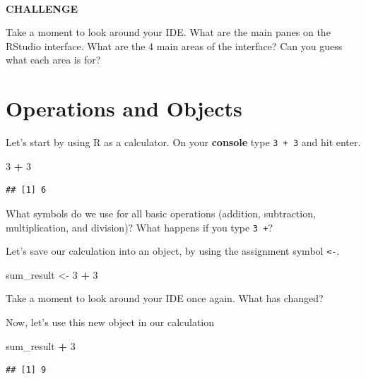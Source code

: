 \documentclass[
]{book}
\newenvironment{Shaded}{\begin{snugshade}}{\end{snugshade}}
\newcommand{\DecValTok}[1]{\textcolor[rgb]{0.00,0.00,0.81}{#1}}
\newcommand{\NormalTok}[1]{#1}
\newcommand{\OperatorTok}[1]{\textcolor[rgb]{0.81,0.36,0.00}{\textbf{#1}}}
\newcommand{\StringTok}[1]{\textcolor[rgb]{0.31,0.60,0.02}{#1}}
\begin{document}
~

\textbf{CHALLENGE}

Take a moment to look around your IDE. What are the main panes on the RStudio interface. What are the 4 main areas of the interface? Can you guess what each area is for?

\hypertarget{operations-and-objects}{%
\section{Operations and Objects}\label{operations-and-objects}}

Let's start by using R as a calculator. On your \textbf{console} type \texttt{3\ +\ 3} and hit enter.

\begin{Shaded}
\begin{Highlighting}[]
\DecValTok{3} \OperatorTok{+}\StringTok{ }\DecValTok{3}
\end{Highlighting}
\end{Shaded}

\begin{verbatim}
## [1] 6
\end{verbatim}

What symbols do we use for all basic operations (addition, subtraction, multiplication, and division)?
What happens if you type \texttt{3\ +}?

Let's save our calculation into an object, by using the assignment symbol \texttt{\textless{}-}.

\begin{Shaded}
\begin{Highlighting}[]
\NormalTok{sum_result <-}\StringTok{ }\DecValTok{3} \OperatorTok{+}\StringTok{ }\DecValTok{3}
\end{Highlighting}
\end{Shaded}

Take a moment to look around your IDE once again. What has changed?

Now, let's use this new object in our calculation

\begin{Shaded}
\begin{Highlighting}[]
\NormalTok{sum_result }\OperatorTok{+}\StringTok{ }\DecValTok{3}
\end{Highlighting}
\end{Shaded}

\begin{verbatim}
## [1] 9
\end{verbatim}
\end{document}
